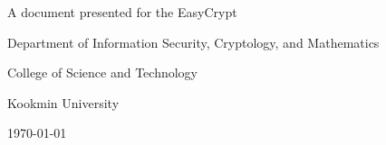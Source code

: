 \begin{titlepage}
	\vspace{1.5cm}
    \vfill
    A document presented for the EasyCrypt
    
    \vspace{0.8cm}
    {\large\textsf{Department of Information Security, Cryptology, and Mathematics}\par}
    {\large\textsf{College of Science and Technology}\par}
    {\large\textsf{Kookmin University}\par}
    \vspace{.25in}
    {\large \textsf{\today}\par}
    
\end{titlepage}

